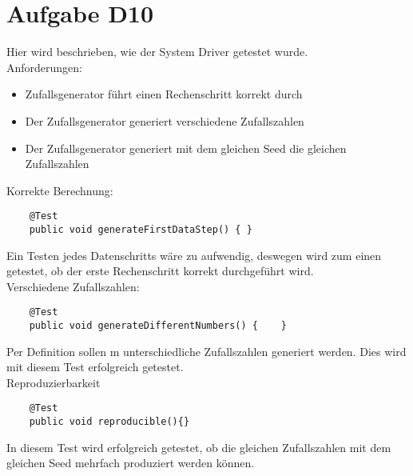 
\chapter{Aufgabe D10}
Hier wird beschrieben, wie der System Driver getestet wurde.\\
Anforderungen:
\begin{itemize}
	\item Zufallsgenerator führt einen Rechenschritt korrekt durch
	\item Der Zufallsgenerator generiert verschiedene Zufallszahlen
	\item Der Zufallsgenerator generiert mit dem gleichen Seed die gleichen Zufallszahlen
\end{itemize}

Korrekte Berechnung:
\begin{lstlisting}
    @Test
    public void generateFirstDataStep() { }
 \end{lstlisting}
 Ein Testen jedes Datenschritts wäre zu aufwendig, deswegen wird zum einen getestet, ob der erste Rechenschritt korrekt durchgeführt wird.\\
 
 Verschiedene Zufallszahlen:
\begin{lstlisting}
    @Test
    public void generateDifferentNumbers() {    }
\end{lstlisting}
Per Definition sollen m unterschiedliche Zufallszahlen generiert werden. Dies wird mit diesem Test erfolgreich getestet.\\
    
Reproduzierbarkeit
\begin{lstlisting}
    @Test
    public void reproducible(){}
\end{lstlisting}
In diesem Test wird erfolgreich getestet, ob die gleichen Zufallszahlen mit dem gleichen Seed mehrfach produziert werden können.